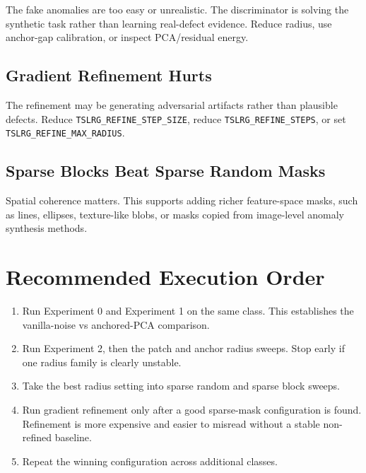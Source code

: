 \documentclass[11pt]{article}
\newcommand{\code}[1]{\texttt{#1}}
\begin{document}
The fake anomalies are too easy or unrealistic. The discriminator is solving the
synthetic task rather than learning real-defect evidence. Reduce radius, use
anchor-gap calibration, or inspect PCA/residual energy.

\subsection{Gradient Refinement Hurts}

The refinement may be generating adversarial artifacts rather than plausible
defects. Reduce \code{TSLRG\_REFINE\_STEP\_SIZE}, reduce
\code{TSLRG\_REFINE\_STEPS}, or set \code{TSLRG\_REFINE\_MAX\_RADIUS}.

\subsection{Sparse Blocks Beat Sparse Random Masks}

Spatial coherence matters. This supports adding richer feature-space masks, such
as lines, ellipses, texture-like blobs, or masks copied from image-level anomaly
synthesis methods.

\section{Recommended Execution Order}

\begin{enumerate}[leftmargin=*]
  \item Run Experiment 0 and Experiment 1 on the same class. This establishes the
  vanilla-noise vs anchored-PCA comparison.

  \item Run Experiment 2, then the patch and anchor radius sweeps. Stop early if
  one radius family is clearly unstable.

  \item Take the best radius setting into sparse random and sparse block sweeps.

  \item Run gradient refinement only after a good sparse-mask configuration is
  found. Refinement is more expensive and easier to misread without a stable
  non-refined baseline.

  \item Repeat the winning configuration across additional classes.
\end{enumerate}
\end{document}
